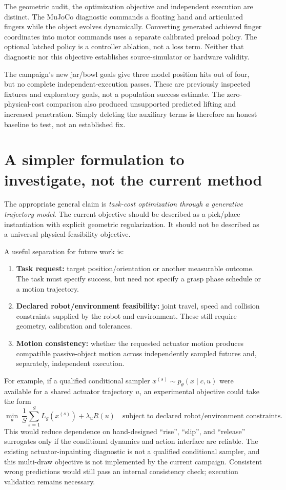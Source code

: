\documentclass[10pt]{article}
\begin{document}
The geometric audit, the optimization objective and independent execution are
distinct. The MuJoCo diagnostic commands a floating hand and articulated
fingers while the object evolves dynamically. Converting generated achieved
finger coordinates into motor commands uses a separate calibrated preload
policy. The optional latched policy is a controller ablation, not a loss term.
Neither that diagnostic nor this objective establishes source-simulator or
hardware validity.

The campaign's new jar/bowl goals give three model position hits out of four,
but no complete independent-execution passes. These are previously inspected
fixtures and exploratory goals, not a population success estimate. The
zero-physical-cost comparison also produced unsupported predicted lifting and
increased penetration. Simply deleting the auxiliary terms is therefore an
honest baseline to test, not an established fix.

\clearpage
\section{A simpler formulation to investigate, not the current method}
The appropriate general claim is \emph{task-cost optimization through a
generative trajectory model}. The current objective should be described as a
pick/place instantiation with explicit geometric regularization. It should not
be described as a universal physical-feasibility objective.

A useful separation for future work is:
\begin{enumerate}
 \item \textbf{Task request:} target position/orientation or another measurable
       outcome. The task must specify success, but need not specify a grasp
       phase schedule or a motion trajectory.
 \item \textbf{Declared robot/environment feasibility:} joint travel, speed and
       collision constraints supplied by the robot and environment. These
       still require geometry, calibration and tolerances.
 \item \textbf{Motion consistency:} whether the requested actuator motion
       produces compatible passive-object motion across independently sampled
       futures and, separately, independent execution.
\end{enumerate}

For example, if a qualified conditional sampler $x^{(s)}\sim
p_\theta(x\mid c,u)$ were available for a shared actuator trajectory $u$, an
experimental objective could take the form
\[
 \min_u\ \frac{1}{S}\sum_{s=1}^{S}L_g(x^{(s)})+\lambda_u R(u)
 \quad\text{subject to declared robot/environment constraints.}
\]
This would reduce dependence on hand-designed ``rise'', ``slip'', and
``release'' surrogates only if the conditional dynamics and action interface
are reliable. The existing actuator-inpainting diagnostic is not a qualified
conditional sampler, and this multi-draw objective is not implemented by the
current campaign. Consistent wrong predictions would still pass an internal
consistency check; execution validation remains necessary.
\end{document}
